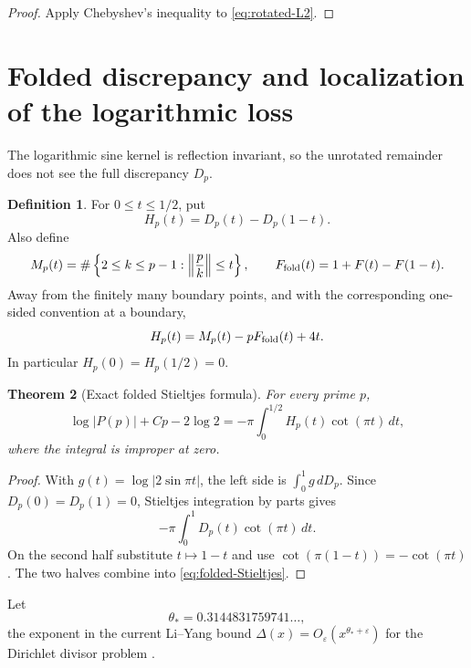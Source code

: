 \documentclass[11pt]{amsart}
\numberwithin{equation}{section}
\newtheorem{theorem}{Theorem}[section]
\theoremstyle{definition}
\newtheorem{definition}[theorem]{Definition}
\theoremstyle{remark}
\newcommand{\eps}{\varepsilon}
\begin{document}
\begin{proof}
Apply Chebyshev's inequality to \eqref{eq:rotated-L2}.
\end{proof}

\section{Folded discrepancy and localization of the logarithmic loss}
\label{sec:folded-discrepancy}

The logarithmic sine kernel is reflection invariant, so the unrotated
remainder does not see the full discrepancy \(D_p\).

\begin{definition}\label{def:Hp}
For \(0\le t\le1/2\), put
\begin{equation}\label{eq:Hp-def}
 H_p(t)=D_p(t)-D_p(1-t).
\end{equation}
Also define
\begin{equation}\label{eq:Mp-Ffold}
 M_p(t)=\#\left\{2\le k\le p-1:\left\|\frac pk\right\|\le t\right\},
 \qquad F_{\rm fold}(t)=1+F(t)-F(1-t).
\end{equation}
Away from the finitely many boundary points, and with the corresponding
one-sided convention at a boundary,
\begin{equation}\label{eq:Hp-Mp}
 H_p(t)=M_p(t)-pF_{\rm fold}(t)+4t.
\end{equation}
In particular \(H_p(0)=H_p(1/2)=0\).
\end{definition}

\begin{theorem}[Exact folded Stieltjes formula]\label{thm:folded-Stieltjes}
For every prime \(p\),
\begin{equation}\label{eq:folded-Stieltjes}
 \log|P(p)|+Cp-2\log2
 =-\pi\int_0^{1/2}H_p(t)\cot(\pi t)\,dt,
\end{equation}
where the integral is improper at zero.
\end{theorem}

\begin{proof}
With \(g(t)=\log|2\sin\pi t|\), the left side is
\(\int_0^1 g\,dD_p\).  Since \(D_p(0)=D_p(1)=0\), Stieltjes integration
by parts gives
\[
 -\pi\int_0^1D_p(t)\cot(\pi t)\,dt.
\]
On the second half substitute \(t\mapsto1-t\) and use
\(\cot(\pi(1-t))=-\cot(\pi t)\).  The two halves combine into
\eqref{eq:folded-Stieltjes}.
\end{proof}

Let
\begin{equation}\label{eq:theta-star}
 \theta_*=0.3144831759741\ldots,
\end{equation}
the exponent in the current Li--Yang bound
\(\Delta(x)=O_\eps(x^{\theta_*+\eps})\) for the Dirichlet divisor problem
\cite{LiYang2023}.
\end{document}
